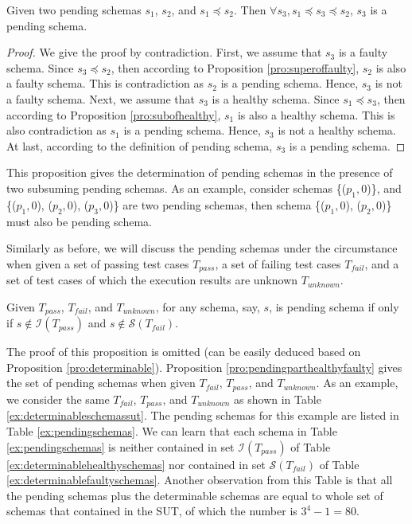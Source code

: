 \begin{proposition}\label{pro:pendingsandwich}
Given two pending schemas $s_{1}$, $s_{2}$, and $s_{1} \preceq s_{2}$. Then $\forall s_{3}, s_{1} \preceq s_{3} \preceq s_{2}$, $s_{3}$ is a pending schema.
\end{proposition}

\begin{proof}
We give the proof by contradiction. First, we assume that $s_{3}$ is a faulty schema. Since $s_{3} \preceq s_{2}$, then according to Proposition \ref{pro:superoffaulty}, $s_{2}$ is also a faulty schema. This is contradiction as $s_{2}$ is a pending schema. Hence, $s_{3}$ is not a faulty schema. Next, we assume that $s_{3}$ is a healthy schema.  Since $s_{1} \preceq s_{3}$, then according to Proposition \ref{pro:subofhealthy}, $s_{1}$ is also a healthy schema. This is also contradiction as $s_{1}$ is a pending schema.  Hence, $s_{3}$ is not a healthy schema. At last, according to the definition of pending schema, $s_{3}$ is a pending schema.
\end{proof}

This proposition gives the determination of pending schemas in the presence of two subsuming pending schemas. As an example, consider schemas \{($p_{1}, 0$)\}, and \{($p_{1}, 0$), ($p_{2}, 0$), ($p_{3}, 0$)\} are two pending schemas, then schema \{($p_{1}, 0$), ($p_{2}, 0$)\} must also be pending schema.

Similarly as before, we will discuss the pending schemas under the circumstance when given a set of passing test cases $T_{pass}$, a set of failing test cases $T_{fail}$, and a set of test cases of which the execution results are unknown $T_{unknown}$.


\begin{proposition}\label{pro:pendingparthealthyfaulty}
Given $T_{pass}$, $T_{fail}$, and $T_{unknown}$, for any schema, say, $s$, is pending schema if only if $s \not\in \mathcal{I}(T_{pass})$ and   $s \not\in \mathcal{S}(T_{fail})$.
\end{proposition}

The proof of this proposition is omitted (can be easily deduced based on Proposition \ref{pro:determinable}). Proposition \ref{pro:pendingparthealthyfaulty} gives the set of pending schemas when given $T_{fail}$, $T_{pass}$, and $T_{unknown}$.
As an example, we consider the same  $T_{fail}$, $T_{pass}$, and $T_{unknown}$ as shown in Table \ref{ex:determinableschemassut}. The pending schemas for this example are listed in Table \ref{ex:pendingschemas}. We can learn that each schema in Table \ref{ex:pendingschemas} is neither contained in set $\mathcal{I}(T_{pass})$ of Table \ref{ex:determinablehealthyschemas} nor contained in set $\mathcal{S}(T_{fail})$ of Table \ref{ex:determinablefaultyschemas}. Another observation from this Table is that all the pending schemas plus the determinable schemas are equal to whole set of  schemas that contained in the SUT, of which the number is $3^{4} - 1 = 80$.


